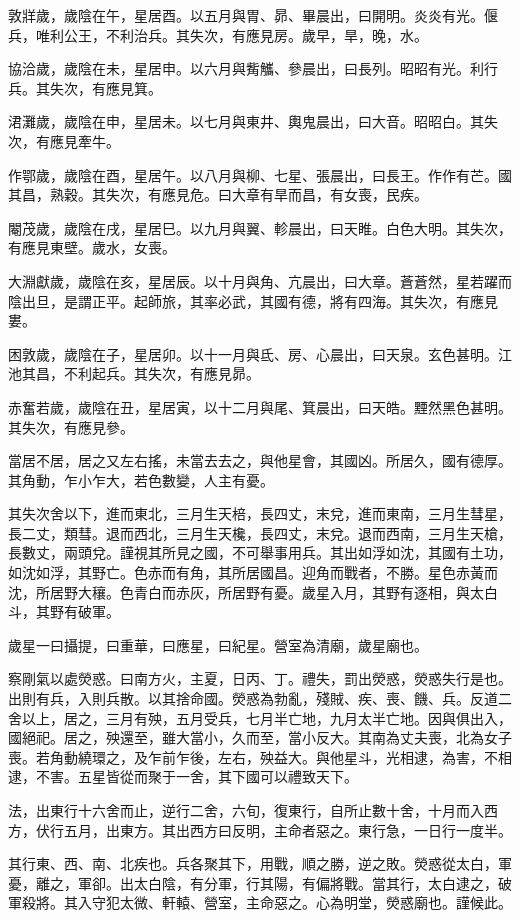 敦牂歲，歲陰在午，星居酉。以五月與胃、昴、畢晨出，曰開明。炎炎有光。偃兵，唯利公王，不利治兵。其失次，有應見房。歲早，旱，晚，水。

協洽歲，歲陰在未，星居申。以六月與觜觿、參晨出，曰長列。昭昭有光。利行兵。其失次，有應見箕。

涒灘歲，歲陰在申，星居未。以七月與東井、輿鬼晨出，曰大音。昭昭白。其失次，有應見牽牛。

作鄂歲，歲陰在酉，星居午。以八月與柳、七星、張晨出，曰長王。作作有芒。國其昌，熟穀。其失次，有應見危。曰大章有旱而昌，有女喪，民疾。

閹茂歲，歲陰在戌，星居巳。以九月與翼、軫晨出，曰天睢。白色大明。其失次，有應見東壁。歲水，女喪。

大淵獻歲，歲陰在亥，星居辰。以十月與角、亢晨出，曰大章。蒼蒼然，星若躍而陰出旦，是謂正平。起師旅，其率必武，其國有德，將有四海。其失次，有應見婁。

困敦歲，歲陰在子，星居卯。以十一月與氐、房、心晨出，曰天泉。玄色甚明。江池其昌，不利起兵。其失次，有應見昴。

赤奮若歲，歲陰在丑，星居寅，以十二月與尾、箕晨出，曰天皓。黫然黑色甚明。其失次，有應見參。

當居不居，居之又左右搖，未當去去之，與他星會，其國凶。所居久，國有德厚。其角動，乍小乍大，若色數變，人主有憂。

其失次舍以下，進而東北，三月生天棓，長四丈，末兌，進而東南，三月生彗星，長二丈，類彗。退而西北，三月生天欃，長四丈，末兌。退而西南，三月生天槍，長數丈，兩頭兌。謹視其所見之國，不可舉事用兵。其出如浮如沈，其國有土功，如沈如浮，其野亡。色赤而有角，其所居國昌。迎角而戰者，不勝。星色赤黃而沈，所居野大穰。色青白而赤灰，所居野有憂。歲星入月，其野有逐相，與太白斗，其野有破軍。

歲星一曰攝提，曰重華，曰應星，曰紀星。營室為清廟，歲星廟也。

察剛氣以處熒惑。曰南方火，主夏，日丙、丁。禮失，罰出熒惑，熒惑失行是也。出則有兵，入則兵散。以其捨命國。熒惑為勃亂，殘賊、疾、喪、饑、兵。反道二舍以上，居之，三月有殃，五月受兵，七月半亡地，九月太半亡地。因與俱出入，國絕祀。居之，殃還至，雖大當小，久而至，當小反大。其南為丈夫喪，北為女子喪。若角動繞環之，及乍前乍後，左右，殃益大。與他星斗，光相逮，為害，不相逮，不害。五星皆從而聚于一舍，其下國可以禮致天下。

法，出東行十六舍而止，逆行二舍，六旬，復東行，自所止數十舍，十月而入西方，伏行五月，出東方。其出西方曰反明，主命者惡之。東行急，一日行一度半。

其行東、西、南、北疾也。兵各聚其下，用戰，順之勝，逆之敗。熒惑從太白，軍憂，離之，軍卻。出太白陰，有分軍，行其陽，有偏將戰。當其行，太白逮之，破軍殺將。其入守犯太微、軒轅、營室，主命惡之。心為明堂，熒惑廟也。謹候此。

